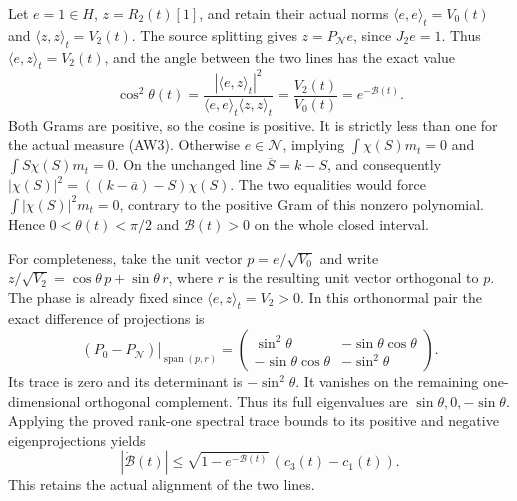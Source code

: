 Let $e=1\in H$, $z=R_2(t)[1]$, and retain their actual norms
$\langle e,e\rangle_t=V_0(t)$ and
$\langle z,z\rangle_t=V_2(t)$. The source splitting gives
$z=P_{\mathcal N}e$, since $J_2e=1$. Thus
$\langle e,z\rangle_t=V_2(t)$, and the angle between the
two lines has the exact value
\[
 \cos^2\theta(t)=\frac{|\langle e,z\rangle_t|^2}
                         {\langle e,e\rangle_t\langle z,z\rangle_t}
       =\frac{V_2(t)}{V_0(t)}=e^{-\mathcal B(t)}.
 \tag{AW19}
\]
Both Grams are positive, so the cosine is positive. It is
strictly less than one for the actual measure (AW3).
Otherwise $e\in\mathcal N$, implying
$\int\chi(S)m_t=0$ and $\int S\chi(S)m_t=0$.
On the unchanged line $\overline S=k-S$, and consequently
$|\chi(S)|^2=((k-\overline a)-S)\chi(S)$.
The two equalities would force $\int|\chi(S)|^2m_t=0$,
contrary to the positive Gram of this nonzero polynomial.
Hence $0<\theta(t)<\pi/2$ and $\mathcal B(t)>0$ on the
whole closed interval.

For completeness, take the unit vector $p=e/\sqrt{V_0}$
and write $z/\sqrt{V_2}=\cos\theta\,p+\sin\theta\,r$,
where $r$ is the resulting unit vector orthogonal to $p$.
The phase is already fixed since $\langle e,z\rangle_t=V_2>0$.
In this orthonormal pair the exact difference of projections is
\[
 \left.(P_0-P_{\mathcal N})\right|_{\operatorname{span}(p,r)}
 =\begin{pmatrix}
   \sin^2\theta&-\sin\theta\cos\theta\\
   -\sin\theta\cos\theta&-\sin^2\theta
  \end{pmatrix}.
 \tag{AW20}
\]
Its trace is zero and its determinant is $-\sin^2\theta$.
It vanishes on the remaining one-dimensional orthogonal
complement. Thus its full eigenvalues are
$\sin\theta,0,-\sin\theta$.
Applying the proved rank-one spectral trace bounds to its
positive and negative eigenprojections yields
\[
 |\dot{\mathcal B}(t)|
 \le\sqrt{1-e^{-\mathcal B(t)}}\,(c_3(t)-c_1(t)).
 \tag{AW21}
\]
This retains the actual alignment of the two lines.

